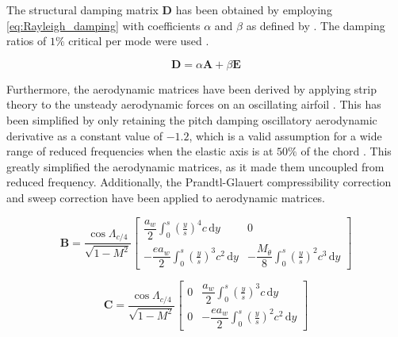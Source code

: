 The structural damping matrix $\mathbf{D}$ has been obtained by employing \autoref{eq:Rayleigh_damping} with coefficients $\alpha$ and $\beta$ as defined by \citeauthor{hellen2013finite} \cite{hellen2013finite}. The damping ratios of $1\%$ critical per mode were used \cite{wright2008introduction}.

\begin{equation}
    \mathbf{D} = \alpha \mathbf{A} +\beta \mathbf{E}
    \label{eq:Rayleigh_damping}
\end{equation}

Furthermore, the aerodynamic matrices have been derived by applying strip theory to the unsteady aerodynamic forces on an oscillating airfoil \cite{wright2008introduction}. This has been simplified by only retaining the pitch damping oscillatory aerodynamic derivative as a constant value of $-1.2$, which is a valid assumption for a wide range of reduced frequencies when the elastic axis is at $50\%$ of the chord \cite{hancock1985teaching, wright2008introduction}. This greatly simplified the aerodynamic matrices, as it made them uncoupled from reduced frequency. Additionally, the Prandtl-Glauert compressibility correction and sweep correction have been applied to aerodynamic matrices.

\begin{equation}
\mathbf{B} =
\frac{\cos\Lambda_{c/4}}{\sqrt{1-M^2}}
\begin{bmatrix}
\dfrac{a_w}{2}
\displaystyle\int_{0}^{s}
\left(\frac{y}{s}\right)^4 c \,\mathrm{d}y
&
0
\\[1.5em]
-\dfrac{e a_w}{2}
\displaystyle\int_{0}^{s}
\left(\frac{y}{s}\right)^3 c^2 \,\mathrm{d}y
&
-\dfrac{M_{\dot{\theta}}}{8}
\displaystyle\int_{0}^{s}
\left(\frac{y}{s}\right)^2 c^3 \,\mathrm{d}y
\end{bmatrix}
\label{eq:B_matrix}
\end{equation}

\begin{equation}
\mathbf{C} =
\frac{\cos\Lambda_{c/4}}{\sqrt{1-M^2}}
\begin{bmatrix}
0
&
\dfrac{a_w}{2}
\displaystyle\int_{0}^{s}
\left(\frac{y}{s}\right)^3 c \,\mathrm{d}y
\\[1.5em]
0
&
-\dfrac{e a_w}{2}
\displaystyle\int_{0}^{s}
\left(\frac{y}{s}\right)^2 c^2 \,\mathrm{d}y
\end{bmatrix}
\label{eq:C_matrix}
\end{equation}





